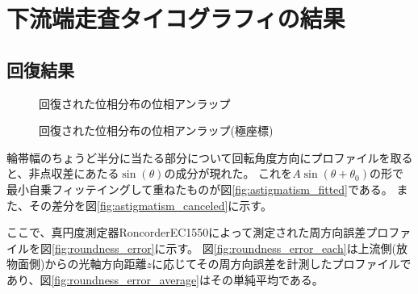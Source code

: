 \clearpage

\newpage

\section{下流端走査タイコグラフィの結果}
\label{chap5_mirror_transverse_result}

\subsection{回復結果}

\begin{figure}[!ht]
\centering
{}
\caption[]{回復された位相分布の位相アンラップ}
\label{fig:reconstructed_phase_unwrapping}
\end{figure}


\begin{figure}[!ht]
\centering
{}
\caption[]{回復された位相分布の位相アンラップ(極座標)}
\label{fig:reconstructed_phase_unwrapping_polar}
\end{figure}

輪帯幅のちょうど半分に当たる部分について回転角度方向にプロファイルを取ると、非点収差にあたる$\sin(\theta)$の成分が現れた。
これを$A \sin(\theta + \theta_0)$の形で最小自乗フィッテイングして重ねたものが図\ref{fig:astigmatism_fitted}である。
また、その差分を図\ref{fig:astigmatism_canceled}に示す。

ここで、真円度測定器RoncorderEC1550によって測定された周方向誤差プロファイルを図\ref{fig:roundness_error}に示す。
図\ref{fig:roundness_error_each}は上流側(放物面側)からの光軸方向距離$z$に応じてその周方向誤差を計測したプロファイルであり、図\ref{fig:roundness_error_average}はその単純平均である。

